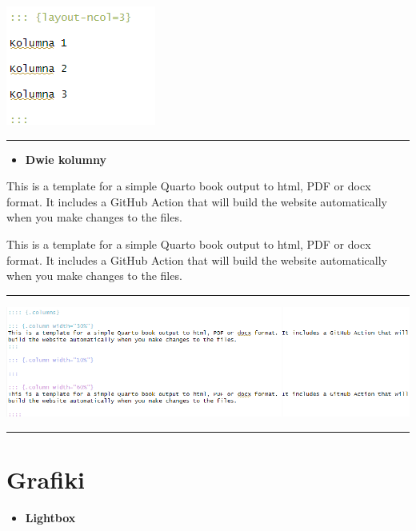 \documentclass[
  a4paper,
  DIV=11,
  numbers=noendperiod,
  oneside,
  open=any]{scrreprt}
\providecommand{\tightlist}{%
  \setlength{\itemsep}{0pt}\setlength{\parskip}{0pt}}\usepackage{longtable,booktabs,array}
\begin{document}
\includegraphics{images/_format_kolumny3.png}

\begin{center}\rule{0.5\linewidth}{0.5pt}\end{center}

\begin{itemize}
\tightlist
\item
  \textbf{Dwie kolumny}
\end{itemize}

This is a template for a simple Quarto book output to html, PDF or docx
format. It includes a GitHub Action that will build the website
automatically when you make changes to the files.

This is a template for a simple Quarto book output to html, PDF or docx
format. It includes a GitHub Action that will build the website
automatically when you make changes to the files.

\begin{center}\rule{0.5\linewidth}{0.5pt}\end{center}

\includegraphics{images/_format_kolumny2.png}

\begin{center}\rule{0.5\linewidth}{0.5pt}\end{center}

\section{Grafiki}\label{grafiki}

\begin{itemize}
\tightlist
\item
  \textbf{Lightbox}
\end{itemize}
\end{document}
